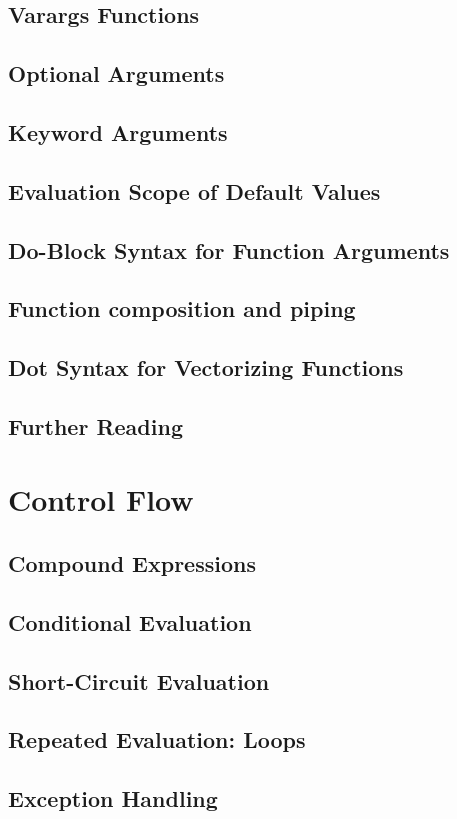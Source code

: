     \section{Varargs Functions}
    \section{Optional Arguments}
    \section{Keyword Arguments}
    \section{Evaluation Scope of Default Values}
    \section{Do-Block Syntax for Function Arguments}
    \section{Function composition and piping}
    \section{Dot Syntax for Vectorizing Functions}
    \section{Further Reading}
\chapter{Control Flow}
    \section{Compound Expressions}
    \section{Conditional Evaluation}
    \section{Short-Circuit Evaluation}
    \section{Repeated Evaluation: Loops}
    \section{Exception Handling}
